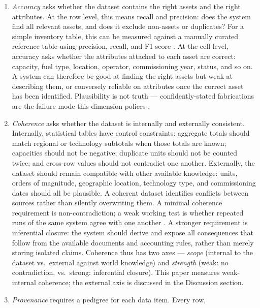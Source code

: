 \documentclass[a4paper,11pt]{article}
\begin{document}
\begin{enumerate}
\def\labelenumi{\arabic{enumi}.}
\item
  \emph{Accuracy} asks whether the dataset contains the right assets and
  the right attributes. At the row level, this means recall and
  precision: does the system find all relevant assets, and does it
  exclude non-assets or duplicates? For a simple inventory table, this
  can be measured against a manually curated reference table using
  precision, recall, and F1 score
  \citep{Hendrycks-Dan2021:mmlu, Wu-Xianjie2025:tablebench, Tenckhoff-Sonke2026:llmstructbench}.
  At the cell level, accuracy asks whether the attributes attached to
  each asset are correct: capacity, fuel type, location, operator,
  commissioning year, status, and so on. A system can therefore be good
  at finding the right assets but weak at describing them, or conversely
  reliable on attributes once the correct asset has been identified.
  Plausibility is not truth --- confidently-stated fabrications are the
  failure mode this dimension polices
  \citep{Lin-Stephanie2022:truthfulqa}.
\item
  \emph{Coherence} asks whether the dataset is internally and externally
  consistent. Internally, statistical tables have control constraints:
  aggregate totals should match regional or technology subtotals when
  those totals are known; capacities should not be negative; duplicate
  units should not be counted twice; and cross-row values should not
  contradict one another. Externally, the dataset should remain
  compatible with other available knowledge: units, orders of magnitude,
  geographic location, technology type, and commissioning dates should
  all be plausible. A coherent dataset identifies conflicts between
  sources rather than silently overwriting them. A minimal coherence
  requirement is non-contradiction; a weak working test is whether
  repeated runs of the same system agree with one another
  \citep{Wang2022:self-consistency}. A stronger requirement is
  inferential closure: the system should derive and expose all
  consequences that follow from the available documents and accounting
  rules, rather than merely storing isolated claims. Coherence thus has
  two axes --- \emph{scope} (internal to the dataset vs.~external
  against world knowledge) and \emph{strength} (weak: no contradiction,
  vs.~strong: inferential closure). This paper measures weak-internal
  coherence; the external axis is discussed in the Discussion section.
\item
  \emph{Provenance} requires a pedigree for each data item. Every row,

\end{enumerate}
\end{document}
